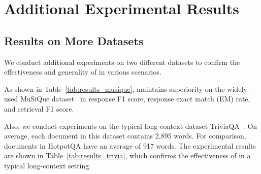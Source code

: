 \clearpage
\appendix

\section{Additional Experimental Results}

\subsection{Results on More Datasets}
\label{app:more_datasets}
We conduct additional experiments on two different datasets to confirm the effectiveness and generality of \modelname in various scenarios.

As shown in Table~\ref{tab:results_musique}, \modelname maintains superiority on the widely-used MuSiQue dataset~\cite{harsh22musique} in response F1 score, response exact match (EM) rate, and retrieval F1 score.

\begin{table}[!ht]
\centering
{}
\caption{Comparison results on MuSiQue.}
\label{tab:results_musique}
\end{table}

Also, we conduct experiments on the typical long-context dataset TriviaQA~\cite{joshi17triviaqa}. On average, each document in this dataset contains 2,895 words. For comparison, documents in HotpotQA have an average of 917 words. The experimental results are shown in Table~\ref{tab:results_trivia}, which confirms the effectiveness of \modelname in a typical long-context setting.

